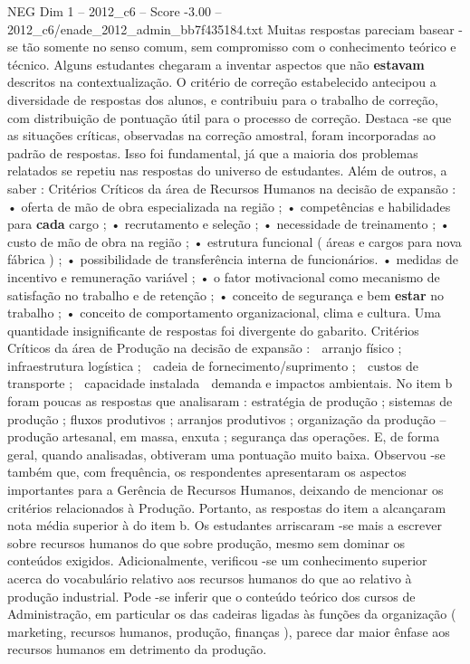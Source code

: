 \begin{textsample}{NEG Dim 1 – 2012\_c6 – Score -3.00 – 2012\_c6/enade\_2012\_admin\_bb7f435184.txt}
Muitas respostas pareciam basear -se tão somente no senso comum, sem compromisso com o conhecimento teórico e técnico.
Alguns estudantes chegaram a inventar aspectos que não \textbf{estavam} descritos na contextualização.
O critério de correção estabelecido antecipou a diversidade de respostas dos alunos, e contribuiu para o trabalho de correção, com distribuição de pontuação útil para o processo de correção.
Destaca -se que as situações críticas, observadas na correção amostral, foram incorporadas ao padrão de respostas.
Isso foi fundamental, já que a maioria dos problemas relatados se repetiu nas respostas do universo de estudantes.
Além de outros, a saber : Critérios Críticos da área de Recursos Humanos na decisão de expansão : • oferta de mão de obra especializada na região ; • competências e habilidades para \textbf{cada} cargo ; • recrutamento e seleção ; • necessidade de treinamento ; • custo de mão de obra na região ; • estrutura funcional ( áreas e cargos para nova fábrica ) ; • possibilidade de transferência interna de funcionários. • medidas de incentivo e remuneração variável ; • o fator motivacional como mecanismo de satisfação no trabalho e de retenção ; • conceito de segurança e bem \textbf{estar} no trabalho ; • conceito de comportamento organizacional, clima e cultura.
Uma quantidade insignificante de respostas foi divergente do gabarito.
Critérios Críticos da área de Produção na decisão de expansão :  arranjo físico ;  infraestrutura logística ;  cadeia de fornecimento/suprimento ;  custos de transporte ;  capacidade instalada  demanda e impactos ambientais.
No item b foram poucas as respostas que analisaram : estratégia de produção ; sistemas de produção ; fluxos produtivos ; arranjos produtivos ; organização da produção – produção artesanal, em massa, enxuta ; segurança das operações.
E, de forma geral, quando analisadas, obtiveram uma pontuação muito baixa.
Observou -se também que, com frequência, os respondentes apresentaram os aspectos importantes para a Gerência de Recursos Humanos, deixando de mencionar os critérios relacionados à Produção.
Portanto, as respostas do item a alcançaram nota média superior à do item b.
Os estudantes arriscaram -se mais a escrever sobre recursos humanos do que sobre produção, mesmo sem dominar os conteúdos exigidos.
Adicionalmente, verificou -se um conhecimento superior acerca do vocabulário relativo aos recursos humanos do que ao relativo à produção industrial.
Pode -se inferir que o conteúdo teórico dos cursos de Administração, em particular os das cadeiras ligadas às funções da organização ( marketing, recursos humanos, produção, finanças ), parece dar maior ênfase aos recursos humanos em detrimento da produção.

\end{textsample}
